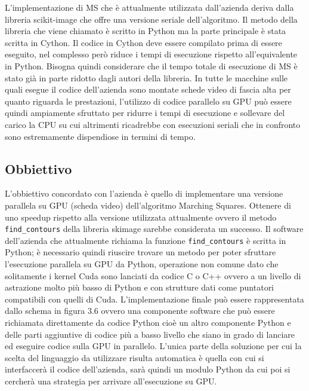 \documentclass[12pt,a4paper]{report}
\begin{document}
L’implementazione di MS che è attualmente utilizzata dall’azienda deriva dalla libreria scikit-image che offre una versione seriale dell’algoritmo. Il metodo della libreria che viene chiamato è scritto in Python ma la parte principale è stata scritta in Cython.
Il codice in Cython deve essere compilato prima di essere eseguito, nel complesso però riduce i tempi di esecuzione rispetto all’equivalente in Python. Bisogna quindi considerare che il tempo totale di esecuzione di MS è stato già in parte ridotto dagli autori della libreria. \newline
In tutte le macchine sulle quali esegue il codice dell'azienda sono montate schede video di fascia alta per quanto riguarda le prestazioni, l'utilizzo di codice parallelo su GPU può essere quindi ampiamente sfruttato per ridurre i tempi di esecuzione e sollevare del carico la CPU su cui altrimenti ricadrebbe con esecuzioni seriali che in confronto sono estremamente dispendiose in termini di tempo.

\subsection{Obbiettivo}
L'obbiettivo concordato con l'azienda è quello di implementare una versione parallela su GPU (scheda video) dell'algoritmo Marching Squares. Ottenere di uno speedup rispetto alla versione utilizzata attualmente ovvero il metodo \verb|find_contours| della libreria skimage sarebbe considerata un successo. \newline
Il software dell'azienda che attualmente richiama la funzione \verb|find_contours| è scritta in Python; è necessario quindi riuscire trovare un metodo per poter sfruttare l'esecuzione parallela su GPU da Python, operazione non comune dato che solitamente i kernel Cuda sono lanciati da codice C o C++ ovvero a un livello di astrazione molto più basso di Python e con strutture dati come puntatori compatibili con quelli di Cuda. \newline
L'implementazione finale può essere rappresentata dallo schema in figura 3.6 ovvero una componente software che può essere richiamata direttamente da codice Python cioè un altro componente Python e delle parti aggiuntive di codice più a basso livello che siano in grado di lanciare ed eseguire codice sulla GPU in parallelo. L'unica parte della soluzione per cui la scelta del linguaggio da utilizzare risulta automatica è quella con cui si interfaccerà il codice dell'azienda, sarà quindi un modulo Python da cui poi si cercherà una strategia per arrivare all'esecuzione su GPU. \newline
\end{document}
